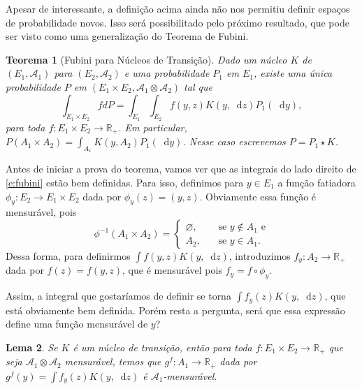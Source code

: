 \documentclass[reqno]{article}
\newcommand*\1{\mathds{1}}
\newtheorem{theorem}{Teorema}[section]
\newtheorem{lemma}[theorem]{Lema}
\renewcommand*\d{\mathop{}\!\mathrm{d}}
\begin{document}
Apesar de interessante, a definição acima ainda não nos permitiu definir espaços de probabilidade novos.
Isso será possibilitado pelo próximo resultado, que pode ser visto como uma generalização do Teorema de Fubini.

\begin{theorem}[Fubini para Núcleos de Transição]
  \label{t:fubini}
  Dado um núcleo $K$ de $(E_1, \mathcal{A}_1)$ para $(E_2, \mathcal{A}_2)$ e uma probabilidade $P_1$ em $E_1$, existe uma única probabilidade $P$ em $(E_1 \times E_2, \mathcal{A}_1 \otimes \mathcal{A}_2)$ tal que
  \begin{equation}
    \label{e:fubini}
    \int_{E_1 \times E_2} f dP = \int_{E_1} \int_{E_2} f(y,z) K(y, \d z) P_1 (\d y),
  \end{equation}
  para toda $f:E_1 \times E_2 \to \mathbb{R}_+$.
  Em particular, $P(A_1 \times A_2) = \int_{A_1} K(y, A_2) P_1 (\d y)$.
  Nesse caso escrevemos $P = P_1 \star K$.
\end{theorem}

Antes de iniciar a prova do teorema, vamos ver que as integrais do lado direito de \eqref{e:fubini} estão bem definidas.
Para isso, definimos para $y \in E_1$ a função fatiadora $\phi_y: E_2 \to E_1 \times E_2$ dada por $\phi_y(z) = (y, z)$.
Obviamente essa função é mensurável, pois
\begin{equation}
  \phi^{-1}(A_1 \times A_2) =
  \begin{cases}
    \varnothing, \quad & \text{ se $y \not \in A_1$ e}\\
    A_2, & \text{ se $y \in A_1$}.
  \end{cases}
\end{equation}
Dessa forma, para definirmos $\int f(y,z) K(y, \d z)$, introduzimos $f_y: A_2 \to \mathbb{R}_+$ dada por $f(z) = f(y,z)$, que é mensurável pois $f_y = f \circ \phi_y$.

Assim, a integral que gostaríamos de definir se torna $\int f_y(z) K(y, \d z)$, que está obviamente bem definida.
Porém resta a pergunta, será que essa expressão define uma função mensurável de $y$?

\begin{lemma}
  Se $K$ é um núcleo de transição, então para toda $f: E_1 \times E_2 \to \mathbb{R}_+$ que seja $\mathcal{A}_1 \otimes \mathcal{A}_2$ mensurável, temos que $g^f:A_1 \to \mathbb{R}_+$ dada por $g^f(y) = \int f_y(z) K(y, \d z)$ é $\mathcal{A}_1$-mensurável.
\end{lemma}
\end{document}
